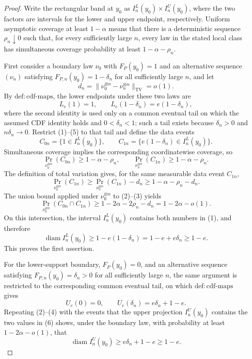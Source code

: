 \documentclass{article}
\begin{document}
\begin{proof}
Write the rectangular band at \(y_0\) as \(I_n^L(y_0)\times I_n^U(y_0)\), where the two factors are intervals for the lower and upper endpoint, respectively.  Uniform asymptotic coverage at least \(1-\alpha\) means that there is a deterministic sequence \(\rho_n\downarrow0\) such that, for every sufficiently large \(n\), every law in the stated local class has simultaneous coverage probability at least \(1-\alpha-\rho_n\).

First consider a boundary law \(\nu_0\) with \(F_P(y_0)=1\) and an alternative sequence \((\nu_n)\) satisfying \(F_{P,n}(y_0)=1-\delta_n\) for all sufficiently large \(n\), and let
\[
 d_n=\|\nu_0^{\otimes n}-\nu_n^{\otimes n}\|_{\mathrm{TV}}=o(1).
\]
By \(\mathrm{def:cdf\text{-}maps}\), the lower endpoints under these two laws are
\[
 L_e(1)=1,
 \qquad
 L_e(1-\delta_n)=e(1-\delta_n), \tag{1}
\]
where the second identity is used only on a common eventual tail on which the assumed CDF identity holds and \(0<\delta_n<1\); such a tail exists because \(\delta_n>0\) and \(n\delta_n\to0\).  Restrict (1)--(5) to that tail and define the data events
\[
 C_{0n}=\{1\in I_n^L(y_0)\},
 \qquad
 C_{1n}=\{e(1-\delta_n)\in I_n^L(y_0)\}.
\]
Simultaneous coverage implies the corresponding coordinatewise coverage, so
\[
 \Pr_{\nu_0^{\otimes n}}(C_{0n})\ge1-\alpha-\rho_n,
 \qquad
 \Pr_{\nu_n^{\otimes n}}(C_{1n})\ge1-\alpha-\rho_n. \tag{2}
\]
The definition of total variation gives, for the same measurable data event \(C_{1n}\),
\[
 \Pr_{\nu_0^{\otimes n}}(C_{1n})
 \ge \Pr_{\nu_n^{\otimes n}}(C_{1n})-d_n
 \ge1-\alpha-\rho_n-d_n. \tag{3}
\]
The union bound applied under \(\nu_0^{\otimes n}\) to (2)--(3) yields
\[
 \Pr_{\nu_0^{\otimes n}}(C_{0n}\cap C_{1n})
 \ge1-2\alpha-2\rho_n-d_n
 =1-2\alpha-o(1). \tag{4}
\]
On this intersection, the interval \(I_n^L(y_0)\) contains both numbers in (1), and therefore
\[
 \operatorname{diam} I_n^L(y_0)
 \ge 1-e(1-\delta_n)
 =1-e+e\delta_n
 \ge1-e. \tag{5}
\]
This proves the first assertion.

For the lower-support boundary, \(F_P(y_0)=0\), and an alternative sequence satisfying \(F_{P,n}(y_0)=\delta_n>0\) for all sufficiently large \(n\), the same argument is restricted to the corresponding common eventual tail, on which \(\mathrm{def:cdf\text{-}maps}\) gives
\[
 U_e(0)=0,
 \qquad
 U_e(\delta_n)=e\delta_n+1-e. \tag{6}
\]
Repeating (2)--(4) with the events that the upper projection \(I_n^U(y_0)\) contains the two values in (6) shows, under the boundary law, with probability at least \(1-2\alpha-o(1)\), that
\[
 \operatorname{diam} I_n^U(y_0)
 \ge e\delta_n+1-e
 \ge1-e. \tag{7}
\]


\end{proof}
\end{document}
